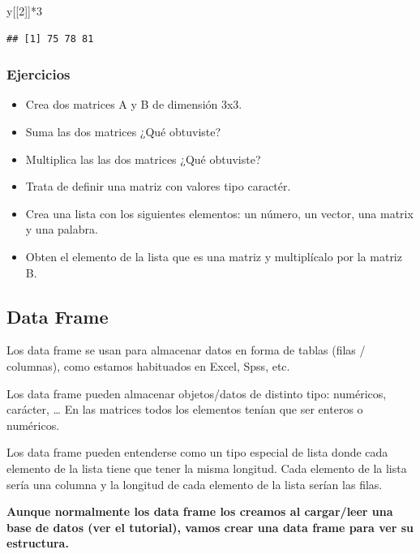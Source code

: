 \documentclass[
]{book}
\newenvironment{Shaded}{\begin{snugshade}}{\end{snugshade}}
\newcommand{\DecValTok}[1]{\textcolor[rgb]{0.00,0.00,0.81}{#1}}
\newcommand{\NormalTok}[1]{#1}
\newcommand{\SpecialCharTok}[1]{\textcolor[rgb]{0.00,0.00,0.00}{#1}}
\providecommand{\tightlist}{%
  \setlength{\itemsep}{0pt}\setlength{\parskip}{0pt}}
\begin{document}
\begin{Shaded}
\begin{Highlighting}[]
\NormalTok{y[[}\DecValTok{2}\NormalTok{]]}\SpecialCharTok{*}\DecValTok{3}
\end{Highlighting}
\end{Shaded}

\begin{verbatim}
## [1] 75 78 81
\end{verbatim}

\hypertarget{ejercicios-1}{%
\subsubsection{Ejercicios}\label{ejercicios-1}}

\begin{itemize}
\tightlist
\item
  Crea dos matrices A y B de dimensión 3x3.
\item
  Suma las dos matrices ¿Qué obtuviste?
\item
  Multiplica las las dos matrices ¿Qué obtuviste?
\item
  Trata de definir una matriz con valores tipo caractér.
\item
  Crea una lista con los siguientes elementos: un número, un vector, una matrix y una palabra.
\item
  Obten el elemento de la lista que es una matriz y multiplícalo por la matriz B.
\end{itemize}

\hypertarget{data-frame}{%
\subsection{Data Frame}\label{data-frame}}

Los data frame se usan para almacenar datos en forma de tablas (filas / columnas), como estamos habituados en Excel, Spss, etc.

Los data frame pueden almacenar objetos/datos de distinto tipo: numéricos, carácter, \ldots{} En las matrices todos los elementos tenían que ser enteros o numéricos.

Los data frame pueden entenderse como un tipo especial de lista donde cada elemento de la lista tiene que tener la misma longitud. Cada elemento de la lista sería una columna y la longitud de cada elemento de la lista serían las filas.

\textbf{Aunque normalmente los data frame los creamos al cargar/leer una base de datos (ver el tutorial), vamos crear una data frame para ver su estructura.}
\end{document}
